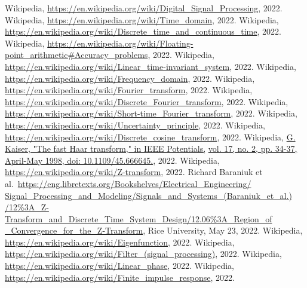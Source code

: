\clearpage
{}
\begin{thebibliography}{9}
        \footnotesize{
         Wikipedia, \underline{https://en.wikipedia.org/wiki/Digital\_Signal\_Processing}, 2022.
         Wikipedia, \underline{https://en.wikipedia.org/wiki/Time\_domain}, 2022.
         Wikipedia, \underline{https://en.wikipedia.org/wiki/Discrete\_time\_and\_continuous\_time}, 2022.
         Wikipedia, \underline{https://en.wikipedia.org/wiki/Floating-point\_arithmetic\#Accuracy\_problems}, 2022.
         Wikipedia, \underline{https://en.wikipedia.org/wiki/Linear\_time-invariant\_system}, 2022.
         Wikipedia, \underline{https://en.wikipedia.org/wiki/Frequency\_domain}, 2022.
         Wikipedia, \underline{https://en.wikipedia.org/wiki/Fourier\_transform}, 2022.
         Wikipedia, \underline{https://en.wikipedia.org/wiki/Discrete\_Fourier\_transform}, 2022.
         Wikipedia, \underline{https://en.wikipedia.org/wiki/Short-time\_Fourier\_transform}, 2022.
         Wikipedia, \underline{https://en.wikipedia.org/wiki/Uncertainty\_principle}, 2022.
         Wikipedia, \underline{https://en.wikipedia.org/wiki/Discrete\_cosine\_transform}, 2022.
         Wikipedia, \underline{G. Kaiser, "The fast Haar transform," in IEEE Potentials,} \underline{vol. 17, no. 2, pp. 34-37, April-May 1998, doi: 10.1109/45.666645.}, 2022.
         Wikipedia, \underline{https://en.wikipedia.org/wiki/Z-transform}, 2022.
         Richard Baraniuk et al.\ \underline{https://eng.libretexts.org/Bookshelves/Electrical\_Engineering/} \underline{Signal\_Processing\_and\_Modeling/Signals\_and\_Systems\_(Baraniuk\_et\_al.)} \underline{/12\%3A\_Z-Transform\_and\_Discrete\_Time\_System\_Design/12.06\%3A\_Region\_of} \underline{\_Convergence\_for\_the\_Z-Transform}, Rice University, May 23, 2022.
         Wikipedia, \underline{https://en.wikipedia.org/wiki/Eigenfunction}, 2022.
         Wikipedia, \underline{https://en.wikipedia.org/wiki/Filter\_(signal\_processing)}, 2022.
         Wikipedia, \underline{https://en.wikipedia.org/wiki/Linear\_phase}, 2022.
         Wikipedia, \underline{https://en.wikipedia.org/wiki/Finite\_impulse\_response}, 2022.
        }
\end{thebibliography}

